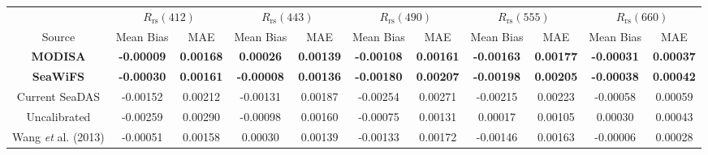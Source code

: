 \documentclass[preview]{standalone}
\begin{document}
\centering
\begin{tabular}{@{\extracolsep{4pt}}ccccccccccc@{}} 
 \hline
 							& \multicolumn{2}{c}{$R_\text{rs}(412)$} & \multicolumn{2}{c}{$R_\text{rs}(443)$} & \multicolumn{2}{c}{$R_\text{rs}(490)$} & \multicolumn{2}{c}{$R_\text{rs}(555)$} & \multicolumn{2}{c}{$R_\text{rs}(660)$}\\ \cline{2-3} \cline{4-5} \cline{6-7} \cline{8-9} \cline{10-11}
 Source 					& Mean Bias			& MAE 			& Mean Bias			& MAE 			& Mean Bias 		& MAE 			& Mean Bias 		& MAE 			& Mean Bias 		& MAE 			\\ \cline{1-1}\cline{2-3} \cline{4-5} \cline{6-7} \cline{8-9} \cline{10-11} 
{\bf MODISA} 				& {\bf -0.00009} 	& {\bf 0.00168} & {\bf  0.00026} 	& {\bf 0.00139} & {\bf -0.00108} 	& {\bf 0.00161} & {\bf -0.00163} 	& {\bf 0.00177} & {\bf -0.00031} & {\bf 0.00037}	\\
{\bf SeaWiFS} 				& {\bf -0.00030} 	& {\bf 0.00161} & {\bf -0.00008} 	& {\bf 0.00136} & {\bf -0.00180} 	& {\bf 0.00207} & {\bf -0.00198} 	& {\bf 0.00205} & {\bf -0.00038} & {\bf 0.00042} 	\\ 
Current SeaDAS 				& -0.00152 			& 0.00212  		& -0.00131 			& 0.00187  		& -0.00254 			& 0.00271  		& -0.00215 			& 0.00223  		& -0.00058 		 & 0.00059 			\\
Uncalibrated 				& -0.00259 			& 0.00290		& -0.00098 			& 0.00160		& -0.00075 			& 0.00131		&  0.00017 			& 0.00105		&  0.00030 		 & 0.00043 			\\
Wang {\it et} al. (2013) 	& -0.00051 			& 0.00158 		&  0.00030 			& 0.00139 		& -0.00133 			& 0.00172 		& -0.00146 			& 0.00163 		& -0.00006 		 & 0.00028 			\\ \hline


\end{tabular}
\end{document}
